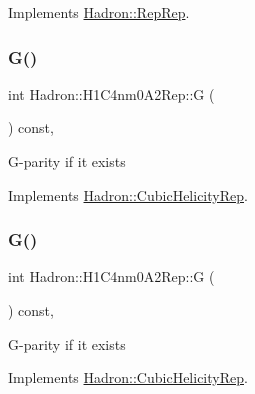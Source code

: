 Implements \mbox{\hyperlink{structHadron_1_1RepRep_a92c8802e5ed7afd7da43ccfd5b7cd92b}{Hadron\+::\+Rep\+Rep}}.

\mbox{\label{structHadron_1_1H1C4nm0A2Rep_a8f9793e51d261ad8dbb7c150b303737b}} 
\subsubsection{\texorpdfstring{G()}{G()}\hspace{0.1cm}{\footnotesize\ttfamily [1/3]}}
{\footnotesize\ttfamily int Hadron\+::\+H1\+C4nm0\+A2\+Rep\+::G (\begin{DoxyParamCaption}{ }\end{DoxyParamCaption}) const\hspace{0.3cm}{\ttfamily [inline]}, {\ttfamily [virtual]}}

G-\/parity if it exists 

Implements \mbox{\hyperlink{structHadron_1_1CubicHelicityRep_a50689f42be1e6170aa8cf6ad0597018b}{Hadron\+::\+Cubic\+Helicity\+Rep}}.

\mbox{\label{structHadron_1_1H1C4nm0A2Rep_a8f9793e51d261ad8dbb7c150b303737b}} 
\subsubsection{\texorpdfstring{G()}{G()}\hspace{0.1cm}{\footnotesize\ttfamily [2/3]}}
{\footnotesize\ttfamily int Hadron\+::\+H1\+C4nm0\+A2\+Rep\+::G (\begin{DoxyParamCaption}{ }\end{DoxyParamCaption}) const\hspace{0.3cm}{\ttfamily [inline]}, {\ttfamily [virtual]}}

G-\/parity if it exists 

Implements \mbox{\hyperlink{structHadron_1_1CubicHelicityRep_a50689f42be1e6170aa8cf6ad0597018b}{Hadron\+::\+Cubic\+Helicity\+Rep}}.

\mbox{\label{structHadron_1_1H1C4nm0A2Rep_a8f9793e51d261ad8dbb7c150b303737b}} 
